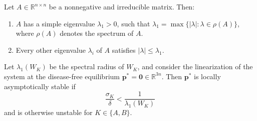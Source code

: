 \documentclass[10pt,a4paper]{amsart}
\begin{document}
\begin{theorem}
Let $A \in \mathbb{R}^{n \times n}$ be a nonnegative and irreducible matrix. Then:  
\begin{enumerate}
    \item $A$ has a simple eigenvalue $\lambda_1 > 0$, such that $\lambda_1 = \max\{|\lambda| : \lambda \in \rho(A)\}$, where $\rho(A)$ denotes the spectrum of $A$.
    \item Every other eigenvalue $\lambda_i$ of $A$ satisfies $|\lambda| \leq \lambda_1$.
\end{enumerate}
\label{thm:pefro}
\end{theorem}

\begin{theorem}
\label{thm:threshold}
Let $\lambda_1(W_K)$ be the spectral radius of $W_{K}$, and consider the linearization of the system at the disease-free equilibrium $\mathbf{p}^* = \mathbf{0} \in \mathbb{R}^{3n}$.  
Then $\mathbf{p}^*$ is locally asymptotically stable if 
\[
\frac{\sigma_K}{\delta} < \frac{1}{\lambda_{1}(W_K)}
\]
and is otherwise unstable for $K \in \{A,B\}$.
\end{theorem}
\end{document}
